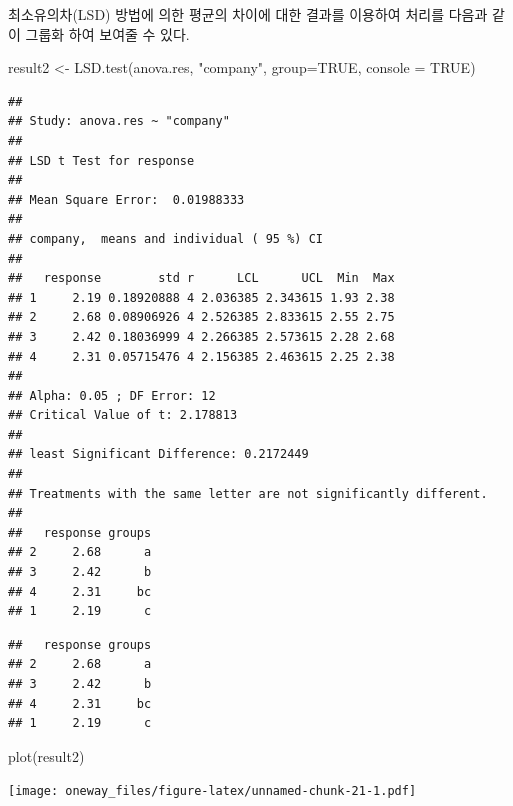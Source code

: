 \documentclass[
]{book}
\newenvironment{Shaded}{\begin{snugshade}}{\end{snugshade}}
\newcommand{\AttributeTok}[1]{\textcolor[rgb]{0.77,0.63,0.00}{#1}}
\newcommand{\ConstantTok}[1]{\textcolor[rgb]{0.00,0.00,0.00}{#1}}
\newcommand{\FunctionTok}[1]{\textcolor[rgb]{0.00,0.00,0.00}{#1}}
\newcommand{\NormalTok}[1]{#1}
\newcommand{\OtherTok}[1]{\textcolor[rgb]{0.56,0.35,0.01}{#1}}
\newcommand{\SpecialCharTok}[1]{\textcolor[rgb]{0.00,0.00,0.00}{#1}}
\newcommand{\StringTok}[1]{\textcolor[rgb]{0.31,0.60,0.02}{#1}}
\begin{document}
최소유의차(LSD) 방법에 의한 평균의 차이에 대한 결과를 이용하여 처리를 다음과 같이 그룹화 하여 보여줄 수 있다.

\begin{Shaded}
\begin{Highlighting}[]
\NormalTok{result2 }\OtherTok{\textless{}{-}} \FunctionTok{LSD.test}\NormalTok{(anova.res, }\StringTok{"company"}\NormalTok{, }\AttributeTok{group=}\ConstantTok{TRUE}\NormalTok{, }\AttributeTok{console =} \ConstantTok{TRUE}\NormalTok{)}
\end{Highlighting}
\end{Shaded}

\begin{verbatim}
## 
## Study: anova.res ~ "company"
## 
## LSD t Test for response 
## 
## Mean Square Error:  0.01988333 
## 
## company,  means and individual ( 95 %) CI
## 
##   response        std r      LCL      UCL  Min  Max
## 1     2.19 0.18920888 4 2.036385 2.343615 1.93 2.38
## 2     2.68 0.08906926 4 2.526385 2.833615 2.55 2.75
## 3     2.42 0.18036999 4 2.266385 2.573615 2.28 2.68
## 4     2.31 0.05715476 4 2.156385 2.463615 2.25 2.38
## 
## Alpha: 0.05 ; DF Error: 12
## Critical Value of t: 2.178813 
## 
## least Significant Difference: 0.2172449 
## 
## Treatments with the same letter are not significantly different.
## 
##   response groups
## 2     2.68      a
## 3     2.42      b
## 4     2.31     bc
## 1     2.19      c
\end{verbatim}

\begin{Shaded}
\end{Shaded}

\begin{verbatim}
##   response groups
## 2     2.68      a
## 3     2.42      b
## 4     2.31     bc
## 1     2.19      c
\end{verbatim}

\begin{Shaded}
\begin{Highlighting}[]
\FunctionTok{plot}\NormalTok{(result2)}
\end{Highlighting}
\end{Shaded}

\texttt{[image: oneway\_files/figure-latex/unnamed-chunk-21-1.pdf]}

\hypertarget{appendix-appendix}{%
\appendix {}}
\end{document}
